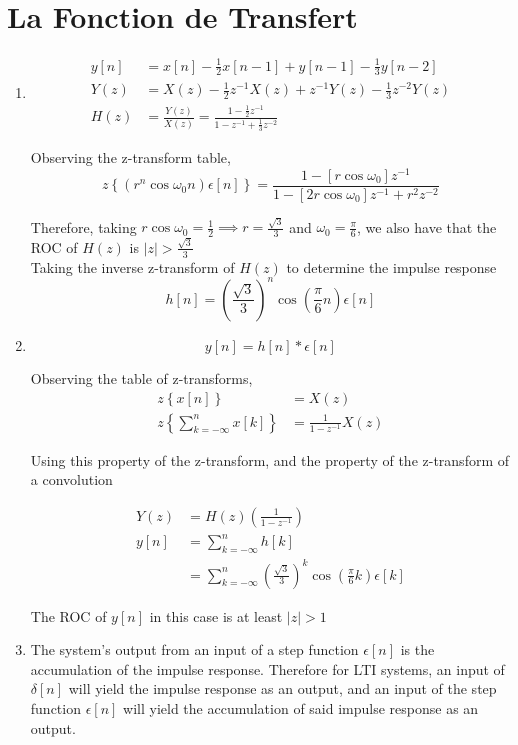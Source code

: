 \documentclass{article}
\begin{document}
\section{La Fonction de Transfert}
\begin{enumerate}
\item
    \begin{align}
        y[n] &= x[n] -\frac{1}{2}x[n-1] + y[n-1] -\frac{1}{3}y[n-2] \nonumber\\
        Y(z) &= X(z) -\frac{1}{2}z^{-1}X(z) +z^{-1}Y(z) -\frac{1}{3}z^{-2}Y(z) \nonumber\\
        H(z) &= \frac{Y(z)}{X(z)}= \frac{1 -\frac{1}{2}z^{-1}}{1 -z^{-1} +\frac{1}{3}z^{-2}} \nonumber
    \end{align}

        Observing the z-transform table,
        $$
        z\left\{\left( r^n\cos\omega_0n\right)\epsilon[n]\right\} = \frac{1 -[r\cos\omega_0]z^{-1}}{1 -[2r\cos\omega_0]z^{-1} +r^2z^{-2}}
        $$

        Therefore, taking $r\cos\omega_0=\frac{1}{2} \implies r=\frac{\sqrt{3}}{3}$ and $\omega_0=\frac{\pi}{6}$, we also have that the ROC of $H(z)$ is $|z|> \frac{\sqrt{3}}{3}$\\

        Taking the inverse z-transform of $H(z)$ to determine the impulse response\\

    $$
    h[n]= \left(\frac{\sqrt{3}}{3}\right)^n\cos\left(\frac{\pi}{6}n\right)\epsilon[n]
    $$

\item
    $$
    y[n]= h[n] * \epsilon[n]
    $$

        Observing the table of z-transforms,
\begin{align}
    z\left\{x[n]\right\} &= X(z) \nonumber\\
    z\left\{\sum_{k=-\infty}^{n} x[k]\right\} &= \frac{1}{1-z^{-1}}X(z) \nonumber
\end{align}

        Using this property of the z-transform, and the property of the z-transform of a convolution

\begin{align}
 Y(z) &= H(z)\left(\frac{1}{1-z^{-1}}\right) \nonumber\\
    y[n] &= \sum_{k=-\infty}^{n} h[k] \nonumber\\
         &= \sum_{k=-\infty}^{n} \left(\frac{\sqrt{3}}{3}\right)^k \cos\left(\frac{\pi}{6}k\right)\epsilon[k] \nonumber
\end{align}

        The ROC of $y[n]$ in this case is at least $|z| > 1$

\item
    The system's output from an input of a step function $\epsilon[n]$ is the accumulation of the impulse response. Therefore for LTI systems, an input of $\delta[n]$ will yield the impulse response as an output, and an input of the step function $\epsilon[n]$ will yield the accumulation of said impulse response as an output.
\end{enumerate}
\end{document}
